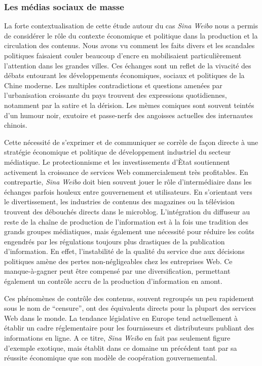 \subsubsection{Les médias sociaux de masse} %

La forte contextualisation de cette étude autour du cas \textit{Sina Weibo} nous a permis de considérer le rôle du contexte économique et politique dans la production et la circulation des contenus. Nous avons vu comment les faits divers et les scandales politiques faisaient couler beaucoup d'encre en mobilisaient particulièrement l'attention dans les grandes villes. Ces échanges sont un reflet de la vivacité des débats entourant les développements économiques, sociaux et politiques de la Chine moderne. Les multiples contradictions et questions amenées par l'urbanisation croissante du pays trouvent des expressions quotidiennes, notamment par la satire et la dérision. Les mèmes comiques sont souvent teintés d'un humour noir, exutoire et passe-nerfs des angoisses actuelles des internautes chinois. 

Cette nécessité de s'exprimer et de communiquer se corrèle de façon directe à une stratégie économique et politique de développement industriel du secteur médiatique. Le protectionnisme et les investissements d'Ètat soutiennent activement la croissance de services Web commercialement très profitables. En contrepartie, \textit{Sina Weibo} doit bien souvent jouer le rôle d'intermédiaire dans les échanges parfois houleux entre gouvernement et utilisateurs. En s'orientant vers le divertissement, les industries de contenus des magazines ou la télévision trouvent des débouchés directs dans le microblog. L'intégration du diffuseur au reste de la chaîne de production de l'information est à la fois une tradition des grands groupes médiatiques, mais également une nécessité pour réduire les coûts engendrés par les régulations toujours plus drastiques de la publication d'information. En effet, l'instabilité de la qualité du service due aux décisions politiques amène des pertes non-négligeables chez les entreprises Web. Ce manque-à-gagner peut être compensé par une diversification, permettant également un contrôle accru de la production d'information en amont. 

Ces phénomènes de contrôle des contenus, souvent regroupés un peu rapidement sous le nom de ``censure'',  ont des équivalents directs pour la plupart des services Web dans le monde. La tendance législative en Europe tend actuellement à établir un cadre réglementaire pour les fournisseurs et distributeurs publiant des informations en ligne. A ce titre, \textit{Sina Weibo} en fait  pas seulement figure d'exemple exotique, mais établit dans ce domaine un précédent tant par sa réussite économique que son modèle de coopération gouvernemental.


